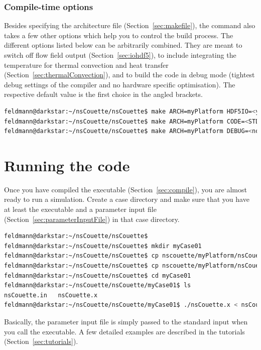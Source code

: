 \documentclass[a4paper, 11pt, DIV=11]{scrartcl}
\begin{document}
\subsubsection{Compile-time options}
\label{sec:compileTimeOptions}

Besides specifying the architecture file (Section~\ref{sec:makefile}),
the  command also takes a few other options which help you to
control the build process. The different options listed below can be
arbitrarily combined. They are meant to switch off \hdf flow field output
(Section~\ref{sec:iohdf5}), to include integrating the temperature for
thermal convection and heat transfer (Section~\ref{sec:thermalConvection}),
and to build the code in debug mode (\ie tightest debug settings of the
compiler and no hardware specific optimisation). The respective default
value is the first choice in the angled brackets.
\begin{lstlisting}[language=bash]
feldmann@darkstar:~/nsCouette/nsCouette$ make ARCH=myPlatform HDF5IO=<yes|no>
feldmann@darkstar:~/nsCouette/nsCouette$ make ARCH=myPlatform CODE=<STD_CODE|TE_CODE>
feldmann@darkstar:~/nsCouette/nsCouette$ make ARCH=myPlatform DEBUG=<no|yes>
\end{lstlisting}



\section{Running the code}
\label{sec:runningTheCode}

Once you have compiled the executable (Section~\ref{sec:compile}), you
are almost ready to run a simulation. Create a case directory and make
sure that you have at least the executable and a parameter input file 
(Section~\ref{sec:parameterInputFile}) in that case directory.
\begin{lstlisting}[language=bash]
feldmann@darkstar:~/nsCouette/nsCouette$
feldmann@darkstar:~/nsCouette/nsCouette$ mkdir myCase01
feldmann@darkstar:~/nsCouette/nsCouette$ cp nscouette/myPlatform/nsCouette.x  myCase01/.
feldmann@darkstar:~/nsCouette/nsCouette$ cp nscouette/myPlatform/nsCouette.in myCase01/.
feldmann@darkstar:~/nsCouette/nsCouette$ cd myCase01
feldmann@darkstar:~/nsCouette/nsCouette/myCase01$ ls
nsCouette.in   nsCouette.x
feldmann@darkstar:~/nsCouette/nsCouette/myCase01$ ./nsCouette.x < nsCouette.in
\end{lstlisting}
Basically, the parameter input file is simply passed to the standard input
when you call the executable. A few detailed examples are described in the
tutorials (Section~\ref{sec:tutorials}).
\end{document}
